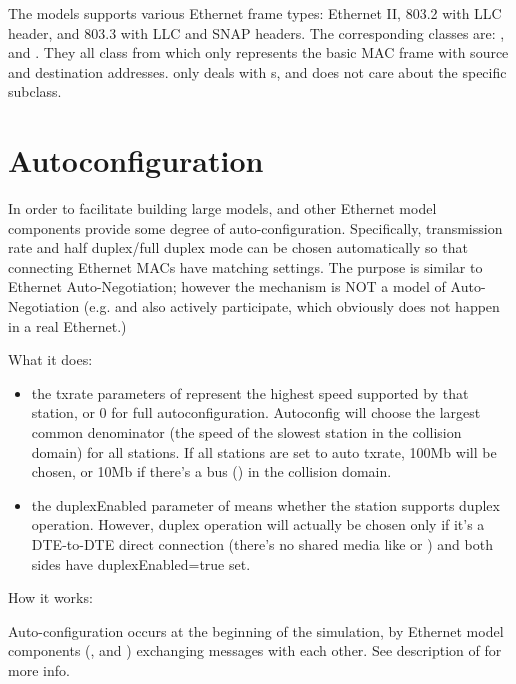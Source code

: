The models supports various Ethernet frame types: Ethernet II, 803.2 with
LLC header, and 803.3 with LLC and SNAP headers. The corresponding classes are:
,  and . They all class
from  which only represents the basic MAC frame with source and
destination addresses.  only deals with s, and does not
care about the specific subclass.


\section{Autoconfiguration}

In order to facilitate building large models,  and other Ethernet model
components provide some degree of auto-configuration. Specifically, transmission
rate and half duplex/full duplex mode can be chosen automatically so that
connecting Ethernet MACs have matching settings. The purpose is similar to
Ethernet Auto-Negotiation; however the mechanism is NOT a model of
Auto-Negotiation (e.g.  and  also actively participate,
which obviously does not happen in a real Ethernet.)

What it does:

\begin{itemize}
  \item the txrate parameters of  represent the highest speed supported
        by that station, or 0 for full autoconfiguration. Autoconfig will choose
        the largest common denominator (the speed of the slowest station in the
        collision domain) for all stations. If all stations are set to auto
        txrate, 100Mb will be chosen, or 10Mb if there's a bus () in
        the collision domain.
  \item the duplexEnabled parameter of  means whether the station supports
        duplex operation. However, duplex operation will actually be chosen only
        if it's a DTE-to-DTE direct connection (there's no shared media like
         or ) and both sides have duplexEnabled=true set.
\end{itemize}

How it works:

Auto-configuration occurs at the beginning of the simulation, by
Ethernet model components (,  and ) exchanging
 messages with each other. See description of 
for more info.

